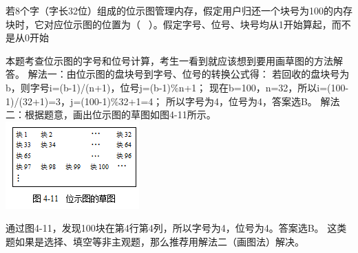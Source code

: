 \question 若8个字（字长32位）组成的位示图管理内存，假定用户归还一个块号为100的内存块时，它对应位示图的位置为（
~）。假定字号、位号、块号均从1开始算起，而不是从0开始
\par{}
\begin{solution}本题考查位示图的字号和位号计算，考生一看到就应该想到要用画草图的方法解答。
解法一：由位示图的盘块号到字号、位号的转换公式得：
若回收的盘块号为b，则字号i=(b-1)/(n+1)，位号j=(b-1)\%n+1；
现在b=100，n=32，所以i=(100-1)/(32+1)=3，j=(100-1)\%32+1=4；
所以字号为4，位号为4，答案选B。
解法二：根据题意，画出位示图的草图如图4-11所示。
\includegraphics[width=2.02083in,height=1.32292in]{computerassets/4905E5C3F3E6FE52866D6CF2A0B188A5.png}

通过图4-11，发现100块在第4行第4列，所以字号为4，位号为4。答案选B。
这类题如果是选择、填空等非主观题，那么推荐用解法二（画图法）解决。
\end{solution}
